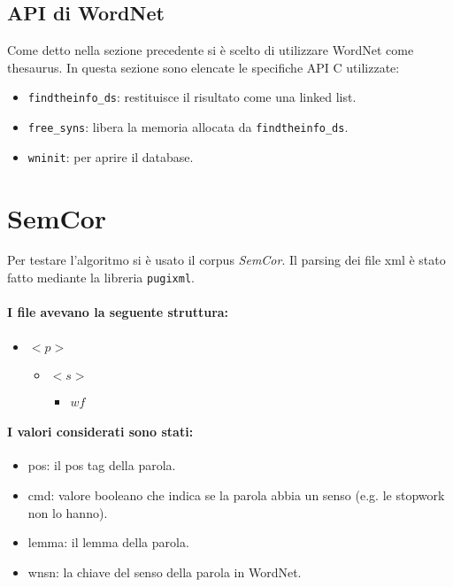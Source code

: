 \subsection{API di WordNet}

Come detto nella sezione precedente si è scelto di utilizzare WordNet come thesaurus. In questa sezione sono elencate le specifiche API C utilizzate:

\begin{itemize}
  \item \texttt{findtheinfo\_ds}: restituisce il risultato come una linked list. 
  \item \texttt{free\_syns}: libera la memoria allocata da \texttt{findtheinfo\_ds}.
  \item \texttt{wninit}: per aprire il database.
\end{itemize}

\section{SemCor}

Per testare l'algoritmo si è usato il corpus \textit{SemCor}. Il parsing dei file xml è stato fatto mediante la libreria \texttt{pugixml}. 

\paragraph{I file avevano la seguente struttura:}

\begin{itemize}
  \item $<p>$ 
    \begin{itemize}
      \item $<s>$ 
        \begin{itemize}
          \item $wf$
        \end{itemize}
    \end{itemize}
\end{itemize}

\paragraph{I valori considerati sono stati:}

\begin{itemize}
  \item pos: il pos tag della parola. 
  \item cmd: valore booleano che indica se la parola abbia un senso (e.g. le stopwork non lo hanno). 
  \item lemma: il lemma della parola. 
  \item wnsn: la chiave del senso della parola in WordNet.
\end{itemize}

